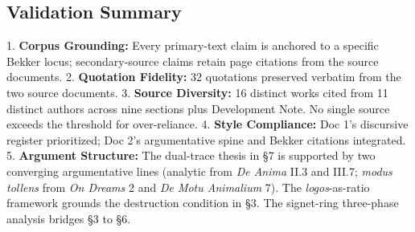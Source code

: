 \documentclass[12pt]{article}
\begin{document}
\subsection*{Validation Summary}

1. \textbf{Corpus Grounding:} Every primary-text claim is anchored to a specific Bekker locus; secondary-source claims retain page citations from the source documents. 2. \textbf{Quotation Fidelity:} 32 quotations preserved verbatim from the two source documents. 3. \textbf{Source Diversity:} 16 distinct works cited from 11 distinct authors across nine sections plus Development Note. No single source exceeds the threshold for over-reliance. 4. \textbf{Style Compliance:} Doc 1's discursive register prioritized; Doc 2's argumentative spine and Bekker citations integrated. 5. \textbf{Argument Structure:} The dual-trace thesis in §7 is supported by two converging argumentative lines (analytic from \textit{De Anima} II.3 and III.7; \textit{modus tollens} from \textit{On Dreams} 2 and \textit{De Motu Animalium} 7). The \textit{logos}-as-ratio framework grounds the destruction condition in §3. The signet-ring three-phase analysis bridges §3 to §6.
\end{document}
